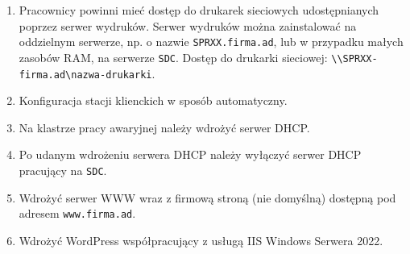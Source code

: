 \begin{enumerate}
    \item Pracownicy powinni mieć dostęp do drukarek sieciowych udostępnianych poprzez serwer wydruków. Serwer wydruków można zainstalować na oddzielnym serwerze, np. o nazwie \texttt{SPRXX.firma.ad}, lub w przypadku małych zasobów RAM, na serwerze \texttt{SDC}. Dostęp do drukarki sieciowej: \texttt{\textbackslash\textbackslash SPRXX-firma.ad\textbackslash nazwa-drukarki}.
    \item Konfiguracja stacji klienckich w sposób automatyczny.
    \item Na klastrze pracy awaryjnej należy wdrożyć serwer DHCP.
    \item Po udanym wdrożeniu serwera DHCP należy wyłączyć serwer DHCP pracujący na \texttt{SDC}.
    \item Wdrożyć serwer WWW wraz z firmową stroną (nie domyślną) dostępną pod adresem \texttt{www.firma.ad}.
    \item Wdrożyć WordPress współpracujący z usługą IIS Windows Serwera 2022.
\end{enumerate}

